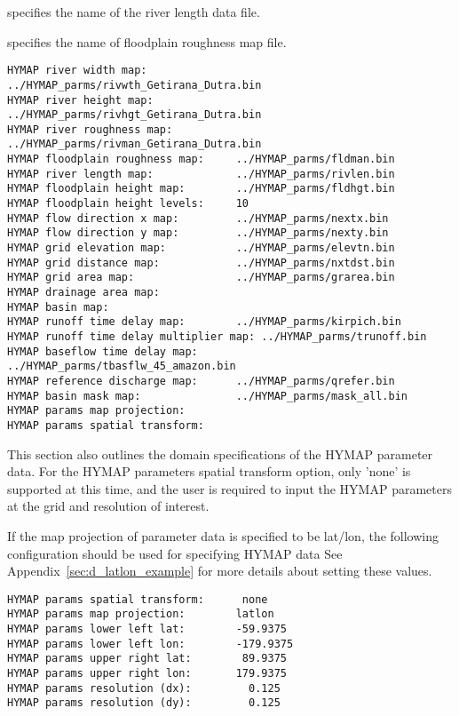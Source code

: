   

  

 specifies the name of the river length data file.

 specifies the name of floodplain roughness map file.

 

 \begin{Verbatim}[frame=single]
HYMAP river width map:              ../HYMAP_parms/rivwth_Getirana_Dutra.bin
HYMAP river height map:             ../HYMAP_parms/rivhgt_Getirana_Dutra.bin 
HYMAP river roughness map:          ../HYMAP_parms/rivman_Getirana_Dutra.bin 
HYMAP floodplain roughness map:     ../HYMAP_parms/fldman.bin
HYMAP river length map:             ../HYMAP_parms/rivlen.bin
HYMAP floodplain height map:        ../HYMAP_parms/fldhgt.bin
HYMAP floodplain height levels:     10
HYMAP flow direction x map:         ../HYMAP_parms/nextx.bin
HYMAP flow direction y map:         ../HYMAP_parms/nexty.bin
HYMAP grid elevation map:           ../HYMAP_parms/elevtn.bin
HYMAP grid distance map:            ../HYMAP_parms/nxtdst.bin
HYMAP grid area map:                ../HYMAP_parms/grarea.bin
HYMAP drainage area map:
HYMAP basin map:
HYMAP runoff time delay map:        ../HYMAP_parms/kirpich.bin
HYMAP runoff time delay multiplier map: ../HYMAP_parms/trunoff.bin
HYMAP baseflow time delay map:      ../HYMAP_parms/tbasflw_45_amazon.bin
HYMAP reference discharge map:      ../HYMAP_parms/qrefer.bin
HYMAP basin mask map:               ../HYMAP_parms/mask_all.bin 
HYMAP params map projection:
HYMAP params spatial transform:
 \end{Verbatim}

 
 This section also outlines the domain specifications of the
 HYMAP parameter data.
 For the HYMAP parameters spatial transform option, only 'none' is
 supported at this time, and the user is required to input the HYMAP
 parameters at the grid and resolution of interest.

 If the map projection of parameter data is specified to be lat/lon,
 the following configuration should be used for specifying HYMAP data
 See Appendix~\ref{sec:d_latlon_example} for more details about
 setting these values.
 

 \begin{Verbatim}[frame=single]
HYMAP params spatial transform:      none
HYMAP params map projection:        latlon
HYMAP params lower left lat:        -59.9375
HYMAP params lower left lon:        -179.9375
HYMAP params upper right lat:        89.9375
HYMAP params upper right lon:       179.9375
HYMAP params resolution (dx):         0.125
HYMAP params resolution (dy):         0.125
 \end{Verbatim}


